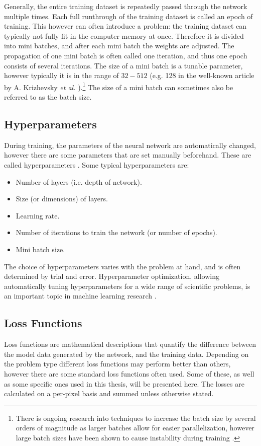 
Generally, the entire training dataset is repeatedly passed through the network multiple times. Each full runthrough of the training dataset is called an epoch of training. This however can often introduce a problem: the training dataset can typically not fully fit in the computer memory at once. Therefore it is divided into mini batches, and after each mini batch the weights are adjusted. The propagation of one mini batch is often called one iteration, and thus one epoch consists of several iterations. The size of a mini batch is a tunable parameter, however typically it is in the range of $32-512$ (e.g. 128 in the well-known article by A. Krizhevsky \textit{et al.} \cite{alexnet}).\footnote{There is ongoing research into techniques to increase the batch size by several orders of magnitude as larger batches allow for easier parallelization, however large batch sizes have been shown to cause instability during training \cite{you2017large}. } The size of a mini batch can sometimes also be referred to as the batch size. 

\subsection{Hyperparameters}
During training, the parameters of the neural network are automatically changed, however there are some parameters that are set manually beforehand. These are called hyperparameters \cite{claesen2015hyperparameter}. Some typical hyperparameters are:
\begin{itemize}
    \item Number of layers (i.e. depth of network).
    \item Size (or dimensions) of layers.
    \item Learning rate.
    \item Number of iterations to train the network (or number of epochs).
    \item Mini batch size.
\end{itemize}

The choice of hyperparameters varies with the problem at hand, and is often determined by trial and error. Hyperparameter optimization, allowing automatically tuning hyperparameters for a wide range of scientific problems, is an important topic in machine learning research \cite{hyperparameteroptimizing}.

\subsection{Loss Functions}
\label{sec:ml:training:lossfunctions}
Loss functions are mathematical descriptions that quantify the difference between the model data generated by the network, and the training data. Depending on the problem type different loss functions may perform better than others, however there are some standard loss functions often used. Some of these, as well as some specific ones used in this thesis, will be presented here. The losses are calculated on a per-pixel basis and summed unless otherwise stated. 

